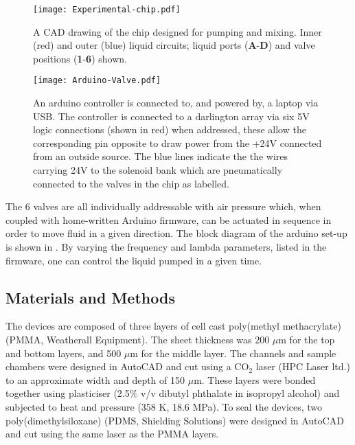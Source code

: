 \begin{figure}[ht]
  \begin{center}
  \texttt{[image: Experimental-chip.pdf]}
  \caption{A CAD drawing of the chip designed for pumping and mixing. Inner (red) and outer (blue) liquid circuits; liquid ports
  (\textbf{A}-\textbf{D}) and valve positions (\textbf{1}-\textbf{6}) shown.}
  \label{fig:Chip}
  \end{center}
\end{figure}

\begin{figure}[ht]
  \begin{center}
  \texttt{[image: Arduino-Valve.pdf]}
  \end{center}
  \caption{An arduino controller is connected to, and powered by, a laptop via USB. The controller is connected
  to a darlington array via six 5V logic connections (shown in red) when addressed, these allow the corresponding pin
  opposite to draw power from the +24V connected from an outside source. The blue lines indicate the the wires
  carrying 24V to the solenoid bank which are pneumatically connected to the valves in the chip as labelled. }
  \label{fig:ValveSetup}
\end{figure}

The 6 valves are all individually addressable with air pressure which, when
coupled with home-written Arduino firmware, can be actuated in sequence in order to move
fluid in a given direction. The block diagram of the arduino set-up is shown in
. By varying the frequency and lambda parameters, listed in the
firmware, one can control the liquid pumped in a given time.



\newpage

\subsection{Materials and Methods}

The devices are composed of three layers of cell cast poly(methyl methacrylate) (PMMA,
Weatherall Equipment). The sheet thickness was 200 $\mu$m for the top and bottom layers, and 500 $\mu$m for
the middle layer. The channels and sample chambers were designed in
AutoCAD and cut using a CO$_2$ laser (HPC Laser ltd.) to an approximate width and depth
of 150 $\mu$m. These layers were bonded together using plasticiser (2.5\% v/v dibutyl
phthalate in isopropyl alcohol) and subjected to heat and pressure (358 K, 18.6 MPa).
To seal the devices, two poly(dimethylsiloxane) (PDMS, Shielding Solutions) were
designed in AutoCAD and cut using the same laser as the PMMA layers.

